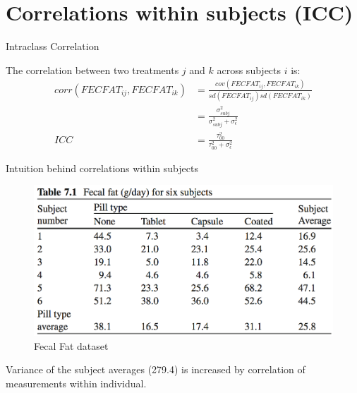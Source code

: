 \documentclass[
  ignorenonframetext,
]{beamer}
\begin{document}
\hypertarget{correlations-within-subjects-icc}{%
\section{Correlations within subjects
(ICC)}\label{correlations-within-subjects-icc}}

\begin{frame}{Intraclass Correlation}
\protect\hypertarget{intraclass-correlation}{}

The correlation between two treatments \(j\) and \(k\) across subjects
\(i\) is: \begin{equation*}
\begin{aligned}
corr(FECFAT_{ij}, FECFAT_{ik}) & = 
          \frac{cov(FECFAT_{ij}, FECFAT_{ik})}
               {sd(FECFAT_{ij}) sd(FECFAT_{ik})} \\
      & = \frac{\sigma_{subj}^2}{\sigma_{subj}^2 + \sigma_{\epsilon}^2} \\
ICC & = \frac{\tau_{00}^2}{\tau_{00}^2 + \sigma_\epsilon^2}
\end{aligned}
\end{equation*}

\end{frame}

\begin{frame}{Intuition behind correlations within subjects}
\protect\hypertarget{intuition-behind-correlations-within-subjects}{}

\begin{figure}
\centering
\includegraphics{VittinghoffTable71.png}
\caption{Fecal Fat dataset}
\end{figure}

\footnotesize

Variance of the subject averages (279.4) is increased by correlation of
measurements within individual.

\end{frame}
\end{document}
